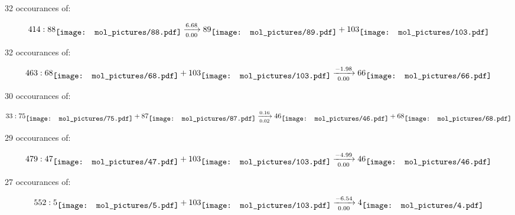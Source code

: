 \documentclass{article}
\begin{document}
\vspace{1cm}


32 occourances of:

$$
414:  
88
\raisebox{-.5\height}{\texttt{[image: mol\_pictures/88.pdf]}}
\xrightarrow[0.00]{6.68}
89
\raisebox{-.5\height}{\texttt{[image: mol\_pictures/89.pdf]}}
+
103
\raisebox{-.5\height}{\texttt{[image: mol\_pictures/103.pdf]}}
$$



\vspace{1cm}


32 occourances of:

$$
463:  
68
\raisebox{-.5\height}{\texttt{[image: mol\_pictures/68.pdf]}}
+
103
\raisebox{-.5\height}{\texttt{[image: mol\_pictures/103.pdf]}}
\xrightarrow[0.00]{-1.98}
66
\raisebox{-.5\height}{\texttt{[image: mol\_pictures/66.pdf]}}
$$



\vspace{1cm}


30 occourances of:

$$
33:  
75
\raisebox{-.5\height}{\texttt{[image: mol\_pictures/75.pdf]}}
+
87
\raisebox{-.5\height}{\texttt{[image: mol\_pictures/87.pdf]}}
\xrightarrow[0.02]{0.16}
46
\raisebox{-.5\height}{\texttt{[image: mol\_pictures/46.pdf]}}
+
68
\raisebox{-.5\height}{\texttt{[image: mol\_pictures/68.pdf]}}
$$



\vspace{1cm}


29 occourances of:

$$
479:  
47
\raisebox{-.5\height}{\texttt{[image: mol\_pictures/47.pdf]}}
+
103
\raisebox{-.5\height}{\texttt{[image: mol\_pictures/103.pdf]}}
\xrightarrow[0.00]{-4.99}
46
\raisebox{-.5\height}{\texttt{[image: mol\_pictures/46.pdf]}}
$$



\vspace{1cm}


27 occourances of:

$$
552:  
5
\raisebox{-.5\height}{\texttt{[image: mol\_pictures/5.pdf]}}
+
103
\raisebox{-.5\height}{\texttt{[image: mol\_pictures/103.pdf]}}
\xrightarrow[0.00]{-6.54}
4
\raisebox{-.5\height}{\texttt{[image: mol\_pictures/4.pdf]}}
$$
\end{document}

